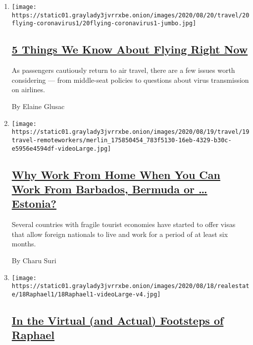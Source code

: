 \begin{enumerate}
\def\labelenumi{\arabic{enumi}.}
\item
  \texttt{[image: https://static01.graylady3jvrrxbe.onion/images/2020/08/20/travel/20flying-coronavirus1/20flying-coronavirus1-jumbo.jpg]}

  \hypertarget{5-things-we-know-about-flying-right-now}{%
  \subsection{\texorpdfstring{\href{/2020/08/20/travel/airplanes-coronavirus.html}{5
  Things We Know About Flying Right
  Now}}{5 Things We Know About Flying Right Now}}\label{5-things-we-know-about-flying-right-now}}

  As passengers cautiously return to air travel, there are a few issues
  worth considering --- from middle-seat policies to questions about
  virus transmission on airlines.

  By Elaine Glusac
\item
  \texttt{[image: https://static01.graylady3jvrrxbe.onion/images/2020/08/19/travel/19travel-remoteworkers/merlin\_175850454\_783f5130-16eb-4329-b30c-e5956e4594df-videoLarge.jpg]}

  \hypertarget{why-work-from-home-when-you-can-work-from-barbados-bermuda-or--estonia}{%
  \subsection{\texorpdfstring{\href{/2020/08/19/travel/remote-worker-visa.html}{Why
  Work From Home When You Can Work From Barbados, Bermuda or \ldots{}
  Estonia?}}{Why Work From Home When You Can Work From Barbados, Bermuda or \ldots{} Estonia?}}\label{why-work-from-home-when-you-can-work-from-barbados-bermuda-or--estonia}}

  Several countries with fragile tourist economies have started to offer
  visas that allow foreign nationals to live and work for a period of at
  least six months.

  By Charu Suri
\item
  \texttt{[image: https://static01.graylady3jvrrxbe.onion/images/2020/08/18/realestate/18Raphael1/18Raphael1-videoLarge-v4.jpg]}

  \hypertarget{in-the-virtual-and-actual-footsteps-of-raphael}{%
  \subsection{\texorpdfstring{\href{/2020/08/18/travel/in-the-virtual-and-actual-footsteps-of-raphael.html}{In
  the Virtual (and Actual) Footsteps of
  Raphael}}{In the Virtual (and Actual) Footsteps of Raphael}}\label{in-the-virtual-and-actual-footsteps-of-raphael}}


\end{enumerate}
